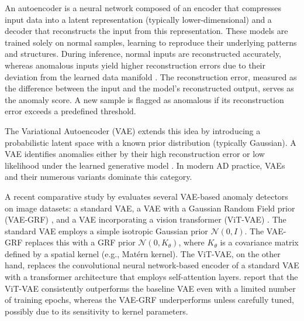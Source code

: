 \documentclass{article}
\begin{document}
An autoencoder \citep{hinton2006reducing} is a neural network composed of an encoder that compresses input data into a latent representation (typically lower-dimensional) and a decoder that reconstructs the input from this representation.  These models are trained solely on normal samples, learning to reproduce their underlying patterns and structures. During inference, normal inputs are reconstructed accurately, whereas anomalous inputs yield higher reconstruction errors due to their deviation from the learned data manifold \citep{sakurada2014anomaly,zhao2017spatio,zhou2017anomaly,chen2018autoencoder}.
The  reconstruction error, measured as the difference between the input and the model's reconstructed output, serves as the anomaly score. A new sample is flagged as anomalous if its reconstruction error exceeds a predefined threshold.

The Variational Autoencoder (VAE) \citep{kingma2013auto} extends this idea by introducing a probabilistic latent space with a known prior distribution (typically Gaussian). A VAE identifies anomalies either by their high reconstruction error or low likelihood under the learned generative model \citep{an2015variational, gong2019memorizing, memarzadeh2020unsupervised}. In modern AD practice, VAEs and their numerous variants dominate this category.

A recent comparative study by \citet{nguyen2024variational} evaluates several VAE-based anomaly detectors on image datasets: a standard VAE, a VAE with a Gaussian Random Field prior (VAE-GRF) \citep{gangloff2024variational}, and a VAE incorporating a vision transformer (ViT-VAE) \citep{lee2022anovit, zhang2023exploring}. The standard VAE employs a simple isotropic Gaussian prior $\mathcal{N}(0,I)$. The VAE-GRF replaces this with a GRF prior $\mathcal{N}(0,K_\theta)$, where $K_\theta$
is a covariance matrix defined by a spatial kernel (e.g., Matérn kernel). The ViT-VAE, on the other hand, replaces the convolutional neural network-based encoder of a standard VAE with a transformer architecture that employs self-attention layers. \citet{nguyen2024variational} report that the ViT-VAE consistently outperforms the baseline VAE  even with
a limited number of training epochs, whereas the VAE-GRF underperforms unless carefully tuned, possibly due to its sensitivity to kernel parameters.
\end{document}

